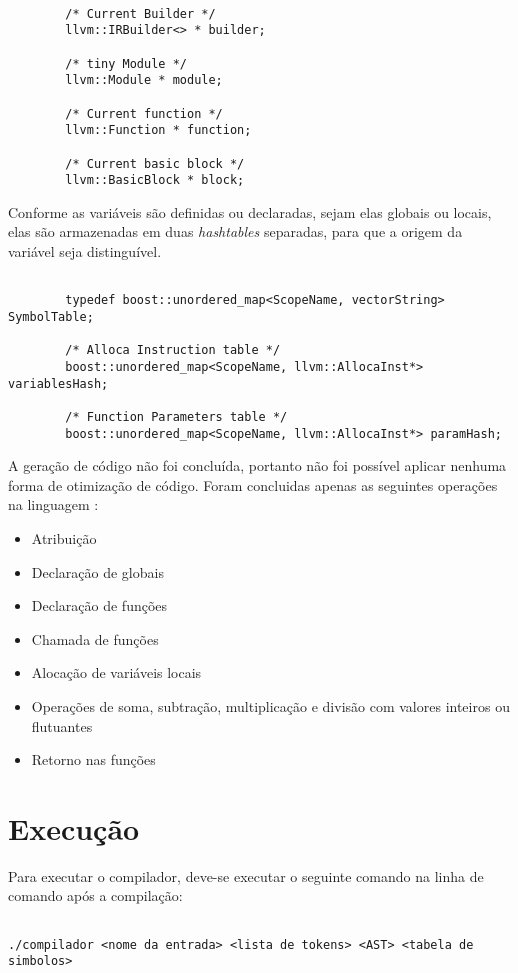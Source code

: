 \documentclass[12pt,a4paper,final]{article}
\begin{document}
\begin{lstlisting}

        /* Current Builder */
        llvm::IRBuilder<> * builder;

        /* tiny Module */
        llvm::Module * module;

        /* Current function */
        llvm::Function * function;

        /* Current basic block */
        llvm::BasicBlock * block;
\end{lstlisting}

Conforme as variáveis são definidas ou declaradas, sejam elas globais ou locais, elas são armazenadas em duas \textit{hashtables} separadas, para que a origem da variável seja distinguível.

\begin{lstlisting}

    	typedef boost::unordered_map<ScopeName, vectorString> SymbolTable;
      
        /* Alloca Instruction table */
        boost::unordered_map<ScopeName, llvm::AllocaInst*> variablesHash;

        /* Function Parameters table */
        boost::unordered_map<ScopeName, llvm::AllocaInst*> paramHash;
\end{lstlisting}

A geração de código não foi concluída, portanto não foi possível aplicar nenhuma forma de otimização de código.
Foram concluidas apenas as seguintes operações na linguagem :
\begin{itemize}
\item Atribuição
\item Declaração de globais
\item Declaração de funções
\item Chamada de funções
\item Alocação de variáveis locais
\item Operações de soma, subtração, multiplicação e divisão com valores inteiros ou flutuantes
\item Retorno nas funções
\end{itemize}

\section*{Execução}
Para executar o compilador, deve-se executar o seguinte comando na linha de comando após a compilação:

\begin{lstlisting}

./compilador <nome da entrada> <lista de tokens> <AST> <tabela de simbolos>

\end{lstlisting}
\end{document}

